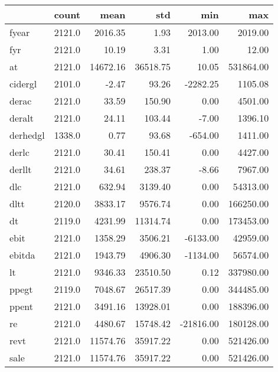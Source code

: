 \begin{tabular}{lrrrrr}
\toprule
{} &   count &      mean &       std &       min &         max \\
\midrule
fyear             &  2121.0 &   2016.35 &      1.93 &   2013.00 &     2019.00 \\
fyr               &  2121.0 &     10.19 &      3.31 &      1.00 &       12.00 \\
at                &  2121.0 &  14672.16 &  36518.75 &     10.05 &   531864.00 \\
cidergl           &  2101.0 &     -2.47 &     93.26 &  -2282.25 &     1105.08 \\
derac             &  2121.0 &     33.59 &    150.90 &      0.00 &     4501.00 \\
deralt            &  2121.0 &     24.11 &    103.44 &     -7.00 &     1396.10 \\
derhedgl          &  1338.0 &      0.77 &     93.68 &   -654.00 &     1411.00 \\
derlc             &  2121.0 &     30.41 &    150.41 &      0.00 &     4427.00 \\
derllt            &  2121.0 &     34.61 &    238.37 &     -8.66 &     7967.00 \\
dlc               &  2121.0 &    632.94 &   3139.40 &      0.00 &    54313.00 \\
dltt              &  2120.0 &   3833.17 &   9576.74 &      0.00 &   166250.00 \\
dt                &  2119.0 &   4231.99 &  11314.74 &      0.00 &   173453.00 \\
ebit              &  2121.0 &   1358.29 &   3506.21 &  -6133.00 &    42959.00 \\
ebitda            &  2121.0 &   1943.79 &   4906.30 &  -1134.00 &    56574.00 \\
lt                &  2121.0 &   9346.33 &  23510.50 &      0.12 &   337980.00 \\
ppegt             &  2119.0 &   7048.67 &  26517.39 &      0.00 &   344485.00 \\
ppent             &  2121.0 &   3491.16 &  13928.01 &      0.00 &   188396.00 \\
re                &  2121.0 &   4480.67 &  15748.42 & -21816.00 &   180128.00 \\
revt              &  2121.0 &  11574.76 &  35917.22 &      0.00 &   521426.00 \\
sale              &  2121.0 &  11574.76 &  35917.22 &      0.00 &   521426.00 \\

\end{tabular}
